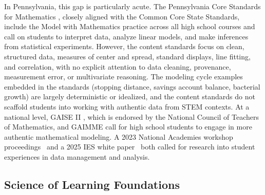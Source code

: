\documentclass[11pt]{article}
\begin{document}
In Pennsylvania, this gap is particularly acute. 
The Pennsylvania Core Standards for Mathematics \cite{pde2014pacoremath}, closely aligned with the Common Core State Standards, include the Model with Mathematics practice across all high school courses and call on students to interpret data, analyze linear models, and make inferences from statistical experiments. 
However, the content standards focus on clean, structured data, measures of center and spread, standard displays, line fitting, and correlation, with no explicit attention to data cleaning, provenance, measurement error, or multivariate reasoning. 
The modeling cycle examples embedded in the standards (stopping distance, savings account balance, bacterial growth) are largely deterministic or idealized, and the content standards do not scaffold students into working with authentic data from STEM contexts. 
At a national level, GAISE II \cite{Bargagliotti2020}, which is endorsed by the National Council of Teachers of Mathematics, and GAIMME \cite{Garfunkel2019} call for high school students to engage in more authentic mathematical modeling.
A 2023 National Academies workshop proceedings~\cite{NASEM2023} and a 2025 IES white paper~\cite{IES2025} both called for research into student experiences in data management and analysis. 


\subsection{Science of Learning Foundations}
\end{document}
